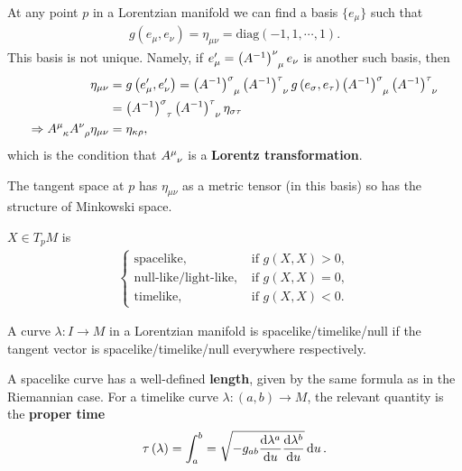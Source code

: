 At any point $p$ in a Lorentzian manifold we can find a basis $\{e_\mu\} $ such that
\begin{align}
    g \left( e_\mu, e_\nu \right) = \eta_{\mu \nu} = \text{diag} \left( -1, 1,\cdots,1 \right) 
.\end{align}
This basis is not unique. Namely, if $e_{\mu}' = \tensor{\left( A^{-1} \right)}{^{\nu}_{\mu}} e_{\nu}$ is another such basis, then
\begin{align}
    \eta_{\mu \nu} &= g\left( e_{\mu}' , e_{\nu}' \right) = \tensor{\left( A^{-1} \right)}{^{\sigma}_{\mu}} \tensor{\left( A^{-1} \right)}{^{\tau}_{\nu}} g \left( e_{\sigma}, e_{\tau} \right)  \tensor{\left( A^{-1} \right)}{^{\sigma}_{\mu}} \tensor{\left( A^{-1} \right)}{^{\tau}_{\nu}} \\
    &=  \tensor{\left( A^{-1} \right) }{^{\sigma}_\tau} \tensor{\left( A^{-1} \right) }{^{\tau}_\nu} \eta_{\sigma \tau}\\
    \implies \tensor{A}{^{\mu}_{\kappa}} \tensor{A}{^{\nu}_\rho} \eta_{\mu \nu} &= \eta_{\kappa \rho}
,\end{align}
which is the condition that $\tensor{A}{^{\mu}_\nu}$ is a \textbf{Lorentz transformation}.

The tangent space at $p$ has $\eta_{\mu \nu}$ as a metric tensor (in this basis) so has the structure of Minkowski space.

\begin{definition}
    $X \in T_p M $ is 
    \begin{align}
        \begin{cases}
            \text{spacelike}, & \text{~if $g\left( X,X \right) > 0$},\\
            \text{null-like/light-like}, & \text{~if $g\left( X,X \right) = 0$},\\
            \text{timelike}, & \text{~if $g\left( X,X \right) < 0$}.
        \end{cases}
    \end{align}
\end{definition}


A curve $\lambda : I \to M$ in a Lorentzian manifold is spacelike/timelike/null if the tangent vector is spacelike/timelike/null everywhere respectively.

A spacelike curve has a well-defined \textbf{length}, given by the same formula as in the Riemannian case. For a timelike curve $\lambda : \left( a,b \right) \to M$, the relevant quantity is the \textbf{proper time}
\begin{align}
    \tau \left( \lambda \right) = \int_a^{b} = \sqrt{-g_{ab} \dv{\lambda^{a}}{u} \dv{\lambda^{b}}{u}} \dd{u} 
.\end{align}

